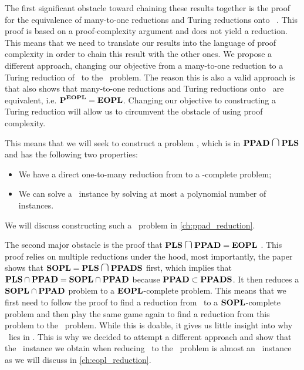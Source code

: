 The first significant obstacle toward chaining these results together is the proof for the equivalence of many-to-one reductions and Turing reductions onto \PPAD\ . This proof is based on a proof-complexity argument and does not yield a reduction. This means that we need to translate our results into the language of proof complexity in order to chain this result with the other ones. We propose a different approach, changing our objective from a many-to-one reduction to a Turing reduction of \Tarski\ to the \EndOfPotentialLine\ problem. The reason this is also a valid approach is that  also shows that many-to-one reductions and Turing reductions onto \EOPL\ are equivalent, i.e. $\textbf{P}^{\textbf{EOPL}} = \textbf{EOPL}$. Changing our objective to constructing a Turing reduction will allow us to circumvent the obstacle of using proof complexity.

This means that we will seek to construct a problem \Tarskistar, which is in $\PPAD  \medcap \PLS$ and has the following two properties:
\begin{itemize}
	\item We have a direct one-to-many reduction from \Tarskistar to a \PPAD-complete problem;
	\item We can solve a \Tarski\ instance by solving at most a polynomial number of \Tarskistar instances.
\end{itemize}
We will discuss constructing such a \Tarskistar\ problem in \cref{ch:ppad_reduction}.

The second major obstacle is the proof that $\PLS \medcap \PPAD = \EOPL$ . This proof relies on multiple reductions under the hood, most importantly, the paper shows that $\SOPL = \PLS \medcap \PPADS$ first, which implies that $\textbf{PLS} \cap \textbf{PPAD} =  \textbf{SOPL} \cap \textbf{PPAD}$ because $\textbf{PPAD} \subset \textbf{PPADS}$. It then reduces a $\textbf{SOPL} \cap \textbf{PPAD}$ problem to a $\textbf{EOPL}$-complete problem. This means that we first need to follow the proof to find a reduction from \Tarskistar\ to a $\textbf{SOPL}$-complete problem and then play the same game again to find a reduction from this problem to the \EndOfPotentialLine\ problem. While this is doable, it gives us little insight into why \Tarski\ lies in \EOPL. This is why we decided to attempt a different approach and show that the \EndOfLine\ instance we obtain when reducing \Tarskistar\ to the \EndOfLine\ problem is almost an \EndOfPotentialLine\ instance as we will discuss in \cref{ch:eopl_reduction}.